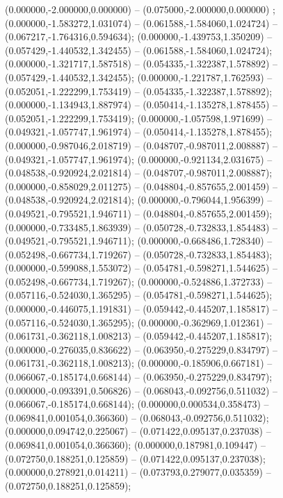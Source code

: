  (0.000000,-2.000000,0.000000) -- (0.075000,-2.000000,0.000000) ;
 (0.000000,-1.583272,1.031074) -- (0.061588,-1.584060,1.024724) -- (0.067217,-1.764316,0.594634);
 (0.000000,-1.439753,1.350209) -- (0.057429,-1.440532,1.342455) -- (0.061588,-1.584060,1.024724);
 (0.000000,-1.321717,1.587518) -- (0.054335,-1.322387,1.578892) -- (0.057429,-1.440532,1.342455);
 (0.000000,-1.221787,1.762593) -- (0.052051,-1.222299,1.753419) -- (0.054335,-1.322387,1.578892);
 (0.000000,-1.134943,1.887974) -- (0.050414,-1.135278,1.878455) -- (0.052051,-1.222299,1.753419);
 (0.000000,-1.057598,1.971699) -- (0.049321,-1.057747,1.961974) -- (0.050414,-1.135278,1.878455);
 (0.000000,-0.987046,2.018719) -- (0.048707,-0.987011,2.008887) -- (0.049321,-1.057747,1.961974);
 (0.000000,-0.921134,2.031675) -- (0.048538,-0.920924,2.021814) -- (0.048707,-0.987011,2.008887);
 (0.000000,-0.858029,2.011275) -- (0.048804,-0.857655,2.001459) -- (0.048538,-0.920924,2.021814);
 (0.000000,-0.796044,1.956399) -- (0.049521,-0.795521,1.946711) -- (0.048804,-0.857655,2.001459);
 (0.000000,-0.733485,1.863939) -- (0.050728,-0.732833,1.854483) -- (0.049521,-0.795521,1.946711);
 (0.000000,-0.668486,1.728340) -- (0.052498,-0.667734,1.719267) -- (0.050728,-0.732833,1.854483);
 (0.000000,-0.599088,1.553072) -- (0.054781,-0.598271,1.544625) -- (0.052498,-0.667734,1.719267);
 (0.000000,-0.524886,1.372733) -- (0.057116,-0.524030,1.365295) -- (0.054781,-0.598271,1.544625);
 (0.000000,-0.446075,1.191831) -- (0.059442,-0.445207,1.185817) -- (0.057116,-0.524030,1.365295);
 (0.000000,-0.362969,1.012361) -- (0.061731,-0.362118,1.008213) -- (0.059442,-0.445207,1.185817);
 (0.000000,-0.276035,0.836622) -- (0.063950,-0.275229,0.834797) -- (0.061731,-0.362118,1.008213);
 (0.000000,-0.185906,0.667181) -- (0.066067,-0.185174,0.668144) -- (0.063950,-0.275229,0.834797);
 (0.000000,-0.093391,0.506826) -- (0.068043,-0.092756,0.511032) -- (0.066067,-0.185174,0.668144);
 (0.000000,0.000534,0.358473) -- (0.069841,0.001054,0.366360) -- (0.068043,-0.092756,0.511032);
 (0.000000,0.094742,0.225067) -- (0.071422,0.095137,0.237038) -- (0.069841,0.001054,0.366360);
 (0.000000,0.187981,0.109447) -- (0.072750,0.188251,0.125859) -- (0.071422,0.095137,0.237038);
 (0.000000,0.278921,0.014211) -- (0.073793,0.279077,0.035359) -- (0.072750,0.188251,0.125859);
